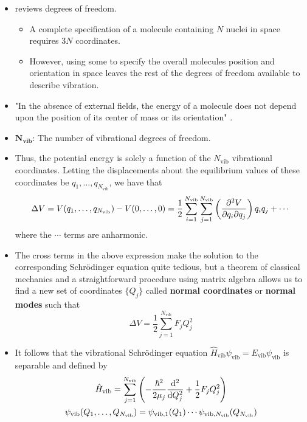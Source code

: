 \documentclass[../notes.tex]{subfiles}
\begin{document}
\begin{itemize}
    \item \textcite{bib:McQuarrieSimon} reviews degrees of freedom.
    \begin{itemize}
        \item A complete specification of a molecule containing $N$ nuclei in space requires $3N$ coordinates.
        \item However, using some to specify the overall molecules position and orientation in space leaves the rest of the degrees of freedom available to describe vibration.
    \end{itemize}
    \item "In the absence of external fields, the energy of a molecule does not depend upon the position of its center of mass or its orientation" \parencite[519]{bib:McQuarrieSimon}.
    \item $\bm{N_\textbf{vib}}$: The number of vibrational degrees of freedom.
    \item Thus, the potential energy is solely a function of the $N_\text{vib}$ vibrational coordinates. Letting the displacements about the equilibrium values of these coordinates be $q_1,\dots,q_{N_\text{vib}}$, we have that
    \begin{equation*}
        \Delta V = V(q_1,\dots,q_{N_\text{vib}})-V(0,\dots,0) = \frac{1}{2}\sum_{i=1}^{N_\text{vib}}\sum_{j=1}^{N_\text{vib}}\left( \pdv{V}{q_i}{q_j} \right)q_iq_j+\cdots
    \end{equation*}
    where the $\cdots$ terms are anharmonic.
    \item The cross terms in the above expression make the solution to the corresponding Schr\"{o}dinger equation quite tedious, but a theorem of classical mechanics and a straightforward procedure using matrix algebra allows us to find a new set of coordinates $\{Q_j\}$ called \textbf{normal coordinates} or \textbf{normal modes} such that
    \begin{equation*}
        \Delta V = \frac{1}{2}\sum_{j=1}^{N_\text{vib}}F_jQ_j^2
    \end{equation*}
    \item It follows that the vibrational Schr\"{o}dinger equation $\hat{H}_\text{vib}\psi_\text{vib}=E_\text{vib}\psi_\text{vib}$ is separable and defined by
    \begin{gather*}
        \hat{H}_\text{vib} = \sum_{j=1}^{N_\text{vib}}\left( -\frac{\hbar^2}{2\mu_j}\dv[2]{Q_j}+\frac{1}{2}F_jQ_j^2 \right)\\
        \psi_\text{vib}(Q_1,\dots,Q_{N_\text{vib}}) = \psi_\text{vib,1}(Q_1)\cdots\psi_{\text{vib},N_\text{vib}}(Q_{N_\text{vib}})\\

\end{gather*}
\end{itemize}
\end{document}

